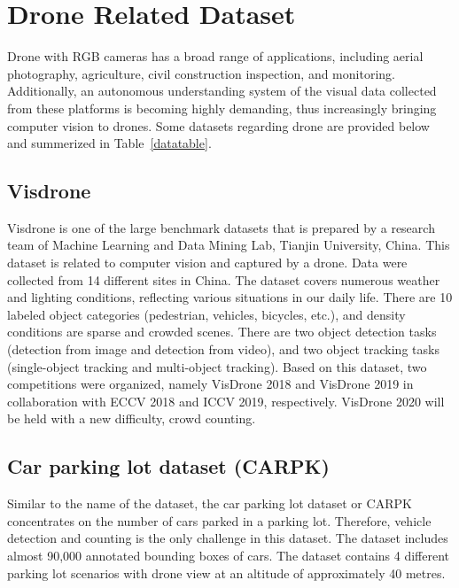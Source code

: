 \section{Drone Related Dataset}
\label{datasetsection}
Drone with RGB cameras has a broad range of applications, including aerial photography, agriculture, civil construction inspection, and monitoring. Additionally, an autonomous understanding system of the visual data collected from these platforms is becoming highly demanding, thus increasingly bringing computer vision to drones. Some datasets regarding drone are provided below and summerized in Table~\ref{datatable}.



\subsection{Visdrone}
Visdrone is one of the large benchmark datasets that is prepared by a research team of Machine Learning and Data Mining Lab, Tianjin University, China. This dataset is related to computer vision and captured by a drone. Data were collected from 14 different sites in China. The dataset covers numerous weather and lighting conditions, reflecting various situations in our daily life. There are 10 labeled object categories (pedestrian, vehicles, bicycles, etc.), and density conditions are sparse and crowded scenes. There are two object detection tasks (detection from image and detection from video), and two object tracking tasks (single-object tracking and multi-object tracking). Based on this dataset, two competitions were organized, namely VisDrone 2018 and VisDrone 2019 in collaboration with ECCV 2018 and ICCV 2019, respectively. VisDrone 2020 will be held with a new difficulty, crowd counting.


\subsection{Car parking lot dataset (CARPK)}
Similar to the name of the dataset, the car parking lot dataset or CARPK concentrates on the number of cars parked in a parking lot. Therefore, vehicle detection and counting is the only challenge in this dataset. The dataset includes almost 90,000 annotated bounding boxes of cars. The dataset contains 4 different parking lot scenarios with drone view at an altitude of approximately 40 metres.

